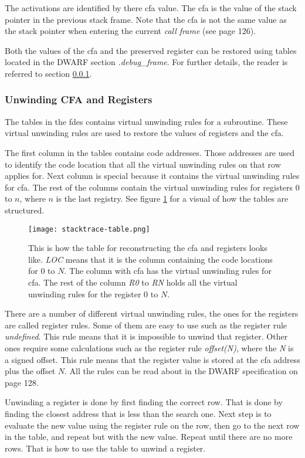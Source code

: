 The activations are identified by there \gls{cfa} value. 
The \gls{cfa} is the value of the stack pointer in the previous stack frame.
Note that the \gls{cfa} is not the same value as the stack pointer when entering the current \emph{call frame} (see \cite{dwarf} page 126).


Both the values of the \gls{cfa} and the preserved register can be restored using tables located in the \gls{DWARF} section \emph{.debug\_frame}.
For further details, the reader is referred to section \ref{sec:evalcfa}.



\subsubsection{Unwinding CFA and Registers} \label{sec:evalcfa}
The tables in the \glspl{fde} contains virtual unwinding rules for a subroutine.
These virtual unwinding rules are used to restore the values of registers and the \gls{cfa}.


The first column in the tables contains code addresses.
Those addresses are used to identify the code location that all the virtual unwinding rules on that row applies for.
Next column is special because it contains the virtual unwinding rules for \gls{cfa}.
The rest of the columns contain the virtual unwinding rules for registers $0$ to $n$, where $n$ is the last registry.
See figure \ref{fig:stacktracetable} for a visual of how the tables are structured.


\begin{figure}[h]
	\centering
	\texttt{[image: stacktrace-table.png]}
	\caption{This is how the table for reconstructing the \gls{cfa} and registers looks like. \emph{LOC} means that it is the column containing the code locations for $0$ to $N$. The column with \gls{cfa} has the virtual unwinding rules for \gls{cfa}. The rest of the column \emph{R0} to \emph{RN} holds all the virtual unwinding rules for the register $0$ to $N$.}
	\label{fig:stacktracetable}
\end{figure}


There are a number of different virtual unwinding rules, the ones for the registers are called register rules.
Some of them are easy to use such as the register rule \emph{undefined}.
This rule means that it is impossible to unwind that register.
Other ones require some calculations such as the register rule \emph{offset(N)}, where the \emph{N} is a signed offset.
This rule means that the register value is stored at the \gls{cfa} address plus the offset $N$.
All the rules can be read about in the \gls{DWARF} specification \cite{dwarf} on page 128.


Unwinding a register is done by first finding the correct row.
That is done by finding the closest address that is less than the search one.
Next step is to evaluate the new value using the register rule on the row, then go to the next row in the table, and repeat but with the new value.
Repeat until there are no more rows.
That is how to use the table to unwind a register.
